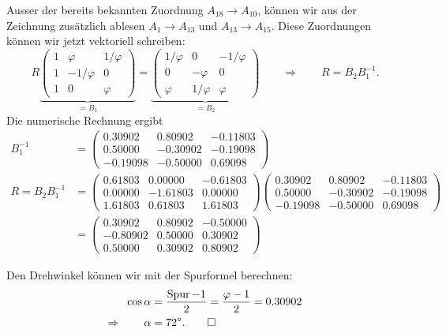\begin{loesung}
\begin{teilaufgaben}
\item
Ausser der bereits bekannten Zuordnung $A_{18}\rightarrow A_{10}$,
können wir aus der Zeichnung zusätzlich ablesen
$A_1\rightarrow A_{13}$
und
$A_{13}\rightarrow A_{15}$.
Diese Zuordnungen können wir jetzt vektoriell schreiben:
\begin{equation}
R
\underbrace{
\begin{pmatrix}
1&   \varphi&1/\varphi\\
1&-1/\varphi&        0\\
1&         0&  \varphi
\end{pmatrix}
}_{\displaystyle=B_1}
=
\underbrace{
\begin{pmatrix}
1/\varphi&        0&-1/\varphi\\
        0& -\varphi&         0\\
  \varphi&1/\varphi&   \varphi
\end{pmatrix}
}_{\displaystyle=B_2}
\qquad\Rightarrow\qquad
R=B_2B_1^{-1}.
\label{40000056:b1}
\end{equation}
Die numerische Rechnung ergibt
\begin{align*}
B_1^{-1}
&=
\begin{pmatrix}
   0.30902&  0.80902& -0.11803\\
   0.50000& -0.30902& -0.19098\\
  -0.19098& -0.50000&  0.69098
\end{pmatrix}
\\
R
=
B_2B_1^{-1}
&=
\begin{pmatrix}
   0.61803&  0.00000& -0.61803\\
   0.00000& -1.61803&  0.00000\\
   1.61803&  0.61803&  1.61803
\end{pmatrix}
\begin{pmatrix}
   0.30902&  0.80902& -0.11803\\
   0.50000& -0.30902& -0.19098\\
  -0.19098& -0.50000&  0.69098
\end{pmatrix}
\\
&=
\begin{pmatrix}
   0.30902&  0.80902& -0.50000\\
  -0.80902&  0.50000&  0.30902\\
   0.50000&  0.30902&  0.80902
\end{pmatrix}
\end{align*}
\item
Den Drehwinkel können wir mit der Spurformel berechnen:
\begin{align*}
\cos\alpha
&=
\frac{\operatorname{Spur}-1}{2}
=
\frac{\varphi-1}{2}
=
0.30902
\\
\Rightarrow\qquad
\alpha
&=
72^\circ.
\qedhere
\end{align*}
\end{teilaufgaben}
\end{loesung}

